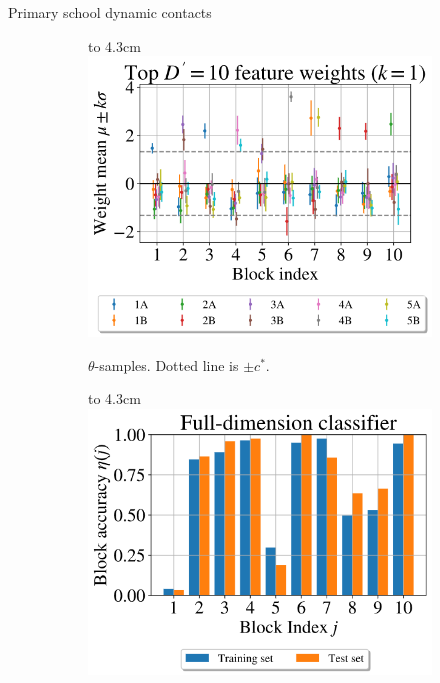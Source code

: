 \documentclass{beamer}
\def\imagebox#1#2{\vtop to #1{\null\hbox{#2}\vfill}}
\begin{document}
	\begin{frame}{Primary school dynamic contacts \cite{schools}}
		\begin{figure}[!h]
			\centering
			\begin{subfigure}[t]{0.45\linewidth}
				\centering
				\imagebox{4.3cm}{\includegraphics[width=\linewidth]{school-null-1}}
				\caption{$\theta$-samples. Dotted line is $\pm c^*$.}
			\end{subfigure}
			\begin{subfigure}[t]{0.45\linewidth}
				\centering
				\imagebox{4.3cm}{\includegraphics[width=\linewidth]{school-accuracy-1}}
			\end{subfigure}
		\end{figure}
	

\end{frame}
\end{document}
